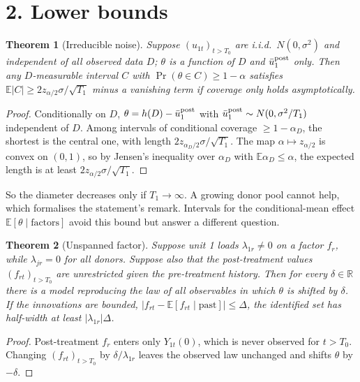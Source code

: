 \documentclass[11pt]{article}
\newtheorem{theorem}{Theorem}
\theoremstyle{definition}
\begin{document}
\section*{2. Lower bounds}
\begin{theorem}[Irreducible noise]\label{thm:noise}
Suppose $(u_{1t})_{t>T_0}$ are i.i.d.\ $N(0,\sigma^2)$ and independent of all observed data $D$; $\theta$ is a function
of $D$ and $\bar u_1^{\rm post}$ only. Then any $D$-measurable interval $C$ with $\Pr(\theta\in C)\ge1-\alpha$ satisfies
$\mathbb E|C|\ge2z_{\alpha/2}\sigma/\sqrt{T_1}$ minus a vanishing term if coverage only holds asymptotically.
\end{theorem}
\begin{proof}
Conditionally on $D$, $\theta=h(D)-\bar u_1^{\rm post}$ with $\bar u_1^{\rm post}\sim N(0,\sigma^2/T_1)$ independent of
$D$. Among intervals of conditional coverage $\ge1-\alpha_D$, the shortest is the central one, with length
$2z_{\alpha_D/2}\sigma/\sqrt{T_1}$. The map $\alpha\mapsto z_{\alpha/2}$ is convex on $(0,1)$, so by Jensen's inequality
over $\alpha_D$ with $\mathbb E\alpha_D\le\alpha$, the expected length is at least $2z_{\alpha/2}\sigma/\sqrt{T_1}$.
\end{proof}
So the diameter decreases only if $T_1\to\infty$. A growing donor pool cannot help, which formalises the statement's
remark. Intervals for the conditional-mean effect $\mathbb E[\theta\mid\text{factors}]$ avoid this bound but answer a different
question.

\begin{theorem}[Unspanned factor]\label{thm:unspanned}
Suppose unit 1 loads $\lambda_{1r}\ne0$ on a factor $f_{r}$, while $\lambda_{jr}=0$ for all donors. Suppose also that the
post-treatment values $(f_{rt})_{t>T_0}$ are unrestricted given the pre-treatment history. Then for every $\delta\in\mathbb R$
there is a model reproducing the law of all observables in which $\theta$ is shifted by $\delta$. If the innovations are
bounded, $|f_{rt}-\mathbb E[f_{rt}\mid\text{past}]|\le\Delta$, the identified set has half-width at least
$|\lambda_{1r}|\Delta$.
\end{theorem}
\begin{proof}
Post-treatment $f_r$ enters only $Y_{1t}(0)$, which is never observed for $t>T_0$. Changing
$(f_{rt})_{t>T_0}$ by $\delta/\lambda_{1r}$ leaves the observed law unchanged and shifts $\theta$ by $-\delta$.
\end{proof}
\end{document}

